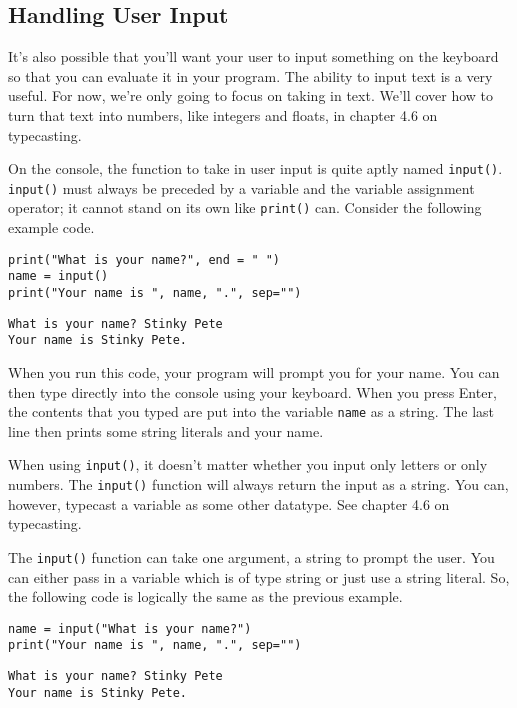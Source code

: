 \subsection{Handling User Input}
It's also possible that you'll want your user to input something on the keyboard so that you can evaluate it in your program. The ability to input text is a very useful. For now, we're only going to focus on taking in text. We'll cover how to turn that text into numbers, like integers and floats, in chapter 4.6 on typecasting.\par
On the console, the function to take in user input is quite aptly named \verb|input()|. \verb|input()| must always be preceded by a variable and the variable assignment operator; it cannot stand on its own like \verb|print()| can. Consider the following example code.\par
\begin{lstlisting}[style=pippython]
print("What is your name?", end = " ")
name = input()
print("Your name is ", name, ".", sep="")
\end{lstlisting}
\begin{lstlisting}
What is your name? Stinky Pete
Your name is Stinky Pete.
\end{lstlisting}
When you run this code, your program will prompt you for your name. You can then type directly into the console using your keyboard. When you press Enter, the contents that you typed are put into the variable \verb|name| as a string. The last line then prints some string literals and your name.\par
When using \verb|input()|, it doesn't matter whether you input only letters or only numbers. The \verb|input()| function will always return the input as a string. You can, however, typecast a variable as some other datatype. See chapter 4.6 on typecasting.\par
The \verb|input()| function can take one argument, a string to prompt the user. You can either pass in a variable which is of type string or just use a string literal. So, the following code is logically the same as the previous example.\par
\begin{lstlisting}[style=pippython]
name = input("What is your name?")
print("Your name is ", name, ".", sep="")
\end{lstlisting}
\begin{lstlisting}
What is your name? Stinky Pete
Your name is Stinky Pete.
\end{lstlisting}
